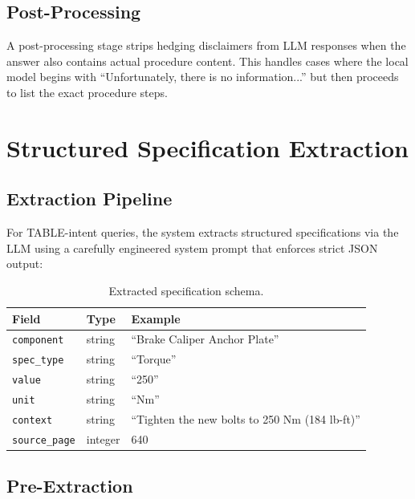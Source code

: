 \documentclass[12pt, a4paper]{article}
\begin{document}
\subsection{Post-Processing}

A post-processing stage strips hedging disclaimers from LLM responses when the answer also contains actual procedure content. This handles cases where the local model begins with ``Unfortunately, there is no information...'' but then proceeds to list the exact procedure steps.

\section{Structured Specification Extraction}

\subsection{Extraction Pipeline}

For TABLE-intent queries, the system extracts structured specifications via the LLM using a carefully engineered system prompt that enforces strict JSON output:

\begin{table}[H]
\centering
\caption{Extracted specification schema.}
\begin{tabular}{l l l}
\toprule
\textbf{Field} & \textbf{Type} & \textbf{Example} \\
\midrule
\texttt{component}   & string  & ``Brake Caliper Anchor Plate'' \\
\texttt{spec\_type}  & string  & ``Torque'' \\
\texttt{value}       & string  & ``250'' \\
\texttt{unit}        & string  & ``Nm'' \\
\texttt{context}     & string  & ``Tighten the new bolts to 250 Nm (184 lb-ft)'' \\
\texttt{source\_page} & integer & 640 \\
\bottomrule
\end{tabular}
\end{table}

\subsection{Pre-Extraction}
\end{document}
